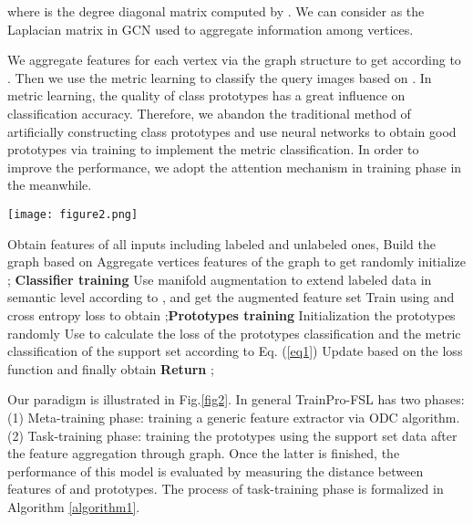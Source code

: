 \documentclass[conference]{IEEEtran}
\begin{document}
where  is the degree diagonal matrix computed by . We can consider  as the Laplacian matrix in GCN\cite{kipf2016semi} used to aggregate information among vertices. 


We aggregate features for each vertex via the graph structure to get  according to \cite{li2020few}. Then we use the metric learning to classify the query images based on . In metric learning, the quality of class prototypes has a great influence on classification accuracy. Therefore, we abandon the traditional method of artificially constructing class prototypes and use neural networks to obtain good prototypes via training to implement the metric classification. In order to improve the performance, we adopt the attention mechanism in training phase in the meanwhile.

\begin{figure*}[htbp]
\centering
\texttt{[image: figure2.png]}
\caption{The overall architecture of the proposed paradigm. The left shows the meta-training phase using ODC resulting in a global feature extractor. The right is the task-training phase comprised of graph-aggregation, classifier training with the support set and the prototypes training.}
\label{fig2}
\end{figure*}



\begin{algorithm}[ht]
\caption{The process of task-training phase with prototypes training.}
\label{algorithm1}
Obtain features of all inputs including labeled and unlabeled ones, \;
Build the graph  based on \;
Aggregate vertices features  of the graph to get \;
randomly initialize ; \qquad\qquad\qquad\qquad\qquad\qquad\textbf{Classifier training}\;
Use manifold augmentation to extend labeled data in semantic level according to \cite{li2020few}, and get the augmented feature set \;
Train  using  and cross entropy loss to obtain ;\qquad\qquad\qquad\qquad\qquad\qquad\qquad\qquad\textbf{Prototypes training}\;
Initialization the prototypes  randomly\;
Use  to calculate the loss of the prototypes classification and the metric classification of the support set according to Eq. (\ref{eq1})\;
Update  based on the loss function and finally obtain \;
\textbf{Return} ;


\end{algorithm}



Our paradigm is illustrated in Fig.\ref{fig2}. In general TrainPro-FSL has two phases: (1) Meta-training phase: training a generic feature extractor via ODC algorithm. (2) Task-training phase: training the prototypes  using the support set data after the feature aggregation through graph. Once the latter is finished, the performance of this model is evaluated by measuring the distance between features of  and prototypes. The process of task-training phase is formalized in Algorithm \ref{algorithm1}.
\end{document}
